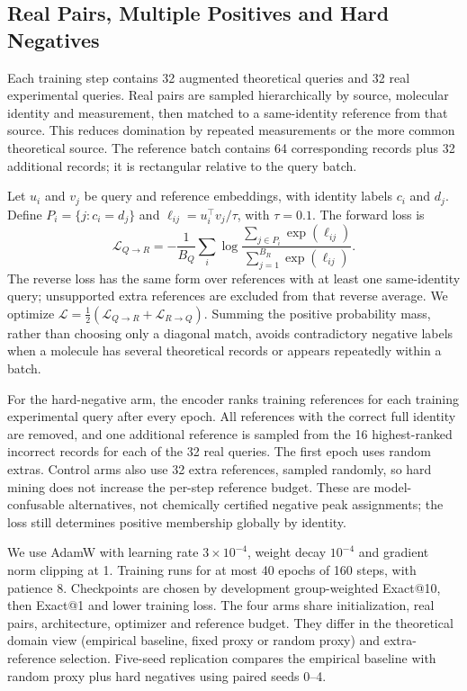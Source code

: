\subsection{Real Pairs, Multiple Positives and Hard Negatives}\label{sec:loss}
Each training step contains 32 augmented theoretical queries and 32 real experimental queries. Real pairs are sampled hierarchically by source, molecular identity and measurement, then matched to a same-identity reference from that source. This reduces domination by repeated measurements or the more common theoretical source. The reference batch contains 64 corresponding records plus 32 additional records; it is rectangular relative to the query batch.

Let $u_i$ and $v_j$ be query and reference embeddings, with identity labels $c_i$ and $d_j$. Define $P_i=\{j:c_i=d_j\}$ and $\ell_{ij}=u_i^\top v_j/\tau$, with $\tau=0.1$. The forward loss is
\begin{equation}\label{eq:contrastive}
\mathcal{L}_{Q\to R}=-\frac{1}{B_Q}\sum_i
\log\frac{\sum_{j\in P_i}\exp(\ell_{ij})}
 {\sum_{j=1}^{B_R}\exp(\ell_{ij})}.
\end{equation}
The reverse loss has the same form over references with at least one same-identity query; unsupported extra references are excluded from that reverse average. We optimize $\mathcal{L}=\tfrac12(\mathcal{L}_{Q\to R}+\mathcal{L}_{R\to Q})$. Summing the positive probability mass, rather than choosing only a diagonal match, avoids contradictory negative labels when a molecule has several theoretical records or appears repeatedly within a batch.

For the hard-negative arm, the encoder ranks training references for each training experimental query after every epoch. All references with the correct full identity are removed, and one additional reference is sampled from the 16 highest-ranked incorrect records for each of the 32 real queries. The first epoch uses random extras. Control arms also use 32 extra references, sampled randomly, so hard mining does not increase the per-step reference budget. These are model-confusable alternatives, not chemically certified negative peak assignments; the loss still determines positive membership globally by identity.

We use AdamW with learning rate $3\times10^{-4}$, weight decay $10^{-4}$ and gradient norm clipping at 1. Training runs for at most 40 epochs of 160 steps, with patience 8. Checkpoints are chosen by development group-weighted Exact@10, then Exact@1 and lower training loss. The four arms share initialization, real pairs, architecture, optimizer and reference budget. They differ in the theoretical domain view (empirical baseline, fixed proxy or random proxy) and extra-reference selection. Five-seed replication compares the empirical baseline with random proxy plus hard negatives using paired seeds 0--4.

